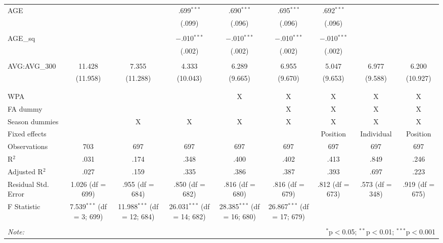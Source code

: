 \begin{table}[H]
\begin{tabular}{@{\extracolsep{5pt}}lcccccccc}
 AGE &  &  & .699$^{***}$ & .690$^{***}$ & .695$^{***}$ & .692$^{***}$ &  &  \\
  &  &  & (.099) & (.096) & (.096) & (.096) &  &  \\
  & & & & & & & & \\
 AGE\_sq &  &  & $-$.010$^{***}$ & $-$.010$^{***}$ & $-$.010$^{***}$ & $-$.010$^{***}$ &  &  \\
  &  &  & (.002) & (.002) & (.002) & (.002) &  &  \\
  & & & & & & & & \\
 AVG:AVG\_300 & 11.428 & 7.355 & 4.333 & 6.289 & 6.955 & 5.047 & 6.977 & 6.200 \\
  & (11.958) & (11.288) & (10.043) & (9.665) & (9.670) & (9.653) & (9.588) & (10.927) \\
  & & & & & & & & \\
\hline \\[-1.8ex]
WPA &  &  &  & X & X & X & X & X \\
FA dummy &  &  &  &  & X & X & X & X \\
Season dummies &  & X & X & X & X & X & X & X \\
Fixed effects &  &  &  &  &  & Position & Individual & Position \\
Observations & 703 & 697 & 697 & 697 & 697 & 697 & 697 & 697 \\
R$^{2}$ & .031 & .174 & .348 & .400 & .402 & .413 & .849 & .246 \\
Adjusted R$^{2}$ & .027 & .159 & .335 & .386 & .387 & .393 & .697 & .223 \\
Residual Std. Error & 1.026 (df = 699) & .955 (df = 684) & .850 (df = 682) & .816 (df = 680) & .816 (df = 679) & .812 (df = 673) & .573 (df = 348) & .919 (df = 675) \\
F Statistic & 7.539$^{***}$ (df = 3; 699) & 11.988$^{***}$ (df = 12; 684) & 26.031$^{***}$ (df = 14; 682) & 28.385$^{***}$ (df = 16; 680) & 26.867$^{***}$ (df = 17; 679) &  &  &  \\
\hline
\hline \\[-1.8ex]
\textit{Note:}  & \multicolumn{8}{r}{$^{*}$p$<$0.05; $^{**}$p$<$0.01; $^{***}$p$<$0.001} \\
\end{tabular}
\end{table}
